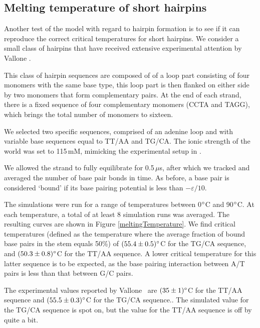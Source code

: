 \subsection{Melting temperature of short hairpins}

Another test of the model with regard to hairpin formation is to see if it can reproduce the correct critical temperatures for short hairpins. We consider a small class of hairpins that have received extensive experimental attention by Vallone \etal \cite{vallone1999melting}.

This class of hairpin sequences are composed of of a loop part consisting of four monomers with the same base type, this loop part is then flanked on either side by two monomers that form complementary pairs. At the end of each strand, there is a fixed sequence of four complementary monomers (CCTA and TAGG), which brings the total number of monomers to sixteen.

We selected two specific sequences, comprised of an adenine loop and with variable base sequences equal to TT/AA and TG/CA. The ionic strength of the world was set to 115\,mM, mimicking the experimental setup in \cite{vallone1999melting}.

We allowed the strand to fully equilibrate for 0.5\,$\mu$s, after which we tracked and averaged the number of base pair bonds in time. As before, a base pair is considered `bound' if its base pairing potential is less than $-\varepsilon / 10$.




The simulations were run for a range of temperatures between 0$^{\circ}$C and 90$^{\circ}$C. At each temperature, a total of at least 8 simulation runs was averaged.
The resulting curves are shown in Figure \ref{meltingTemperature}. We find critical temperatures (defined as the temperature where the average fraction of bound base pairs in the stem equals 50\%) of $(55.4 \pm 0.5)^{\circ}$C for the TG/CA sequence, and $(50.3 \pm 0.8)^{\circ}$C for the TT/AA sequence. A lower critical temperature for this latter sequence is to be expected, as the base pairing interaction between A/T pairs is less than that between G/C pairs.

The experimental values reported by Vallone \etal\ are $(35 \pm 1)^{\circ}$C for the TT/AA sequence and $(55.5 \pm 0.3)^{\circ}$C for the TG/CA sequence.\cite{vallone1999melting}. The simulated value for the TG/CA sequence is spot on, but the value for the TT/AA sequence is off by quite a bit.

